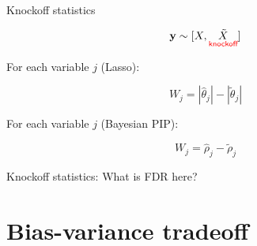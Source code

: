 \documentclass[
  ignorenonframetext,
  aspectratio=169]{beamer}
\begin{document}
\begin{frame}{Knockoff statistics}
\protect\hypertarget{knockoff-statistics}{}
\large

\[\mathbf{y} \sim [X, \underset{\textsf{\color{red} knockoff}}{\tilde{X}}]\]

For each variable \(j\) (Lasso):

\[W_{j} = |\hat{\theta}_{j}| - |\tilde{\theta}_{j}|\]

For each variable \(j\) (Bayesian PIP):

\[W_{j} = \hat{\rho}_{j} - \tilde{\rho}_{j}\]
\end{frame}

\begin{frame}{Knockoff statistics: What is FDR here?}
\protect\hypertarget{knockoff-statistics-what-is-fdr-here}{}
\scriptsize

\normalsize

\scriptsize

\normalsize

\scriptsize


\normalsize

\scriptsize


\normalsize
\end{frame}

\hypertarget{bias-variance-tradeoff}{%
\section{Bias-variance tradeoff}\label{bias-variance-tradeoff}}
\end{document}
